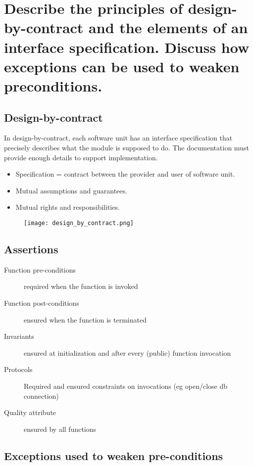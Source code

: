 \clearpage{}
\section{Describe the principles of design-by-contract and the elements
of an interface specification. Discuss how exceptions can be used to
weaken preconditions.}


\subsection{Design-by-contract}

In design-by-contract, each software unit has an interface specification that precisely
describes what the module is supposed to do. The documentation must provide enough
details to support implementation. 

\begin{itemize}
    \item Specification = contract between the provider and user of software unit. 
    \item Mutual assumptions and guarantees. 
    \item Mutual rights and responsibilities.
\end{itemize}

\begin{figure}[!ht]
    \centering
    \texttt{[image: design\_by\_contract.png]}
\end{figure}

\subsection{Assertions}

\begin{description}
    \item[Function pre-conditions] required when the function is invoked
    \item[Function post-conditions] ensured when the function is terminated
    \item[Invariants] ensured at initialization and after every (public) function invocation
    \item[Protocols] Required and ensured constraints on invocations (eg open/close db connection)
    \item[Quality attribute] ensured by all functions
\end{description}

\subsection{Exceptions used to weaken pre-conditions}

